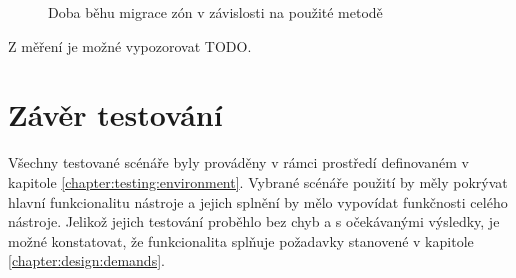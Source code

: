\begin{figure}
  \centering
  \label{graph:measuremet:migration}
  \caption{Doba běhu migrace zón v závislosti na použité metodě}
\end{figure}

Z měření je možné vypozorovat TODO.
\section{Závěr testování}
\label{chapter:testing:scenario:conclusion}
Všechny testované scénáře byly prováděny v rámci prostředí definovaném v kapitole \ref{chapter:testing:environment}. Vybrané 
scénáře použití by měly pokrývat hlavní funkcionalitu nástroje a jejich splnění by mělo vypovídat funkčnosti celého nástroje.
Jelikož jejich testování proběhlo bez chyb a s očekávanými výsledky, je možné konstatovat, že funkcionalita splňuje požadavky
stanovené v kapitole \ref{chapter:design:demands}.